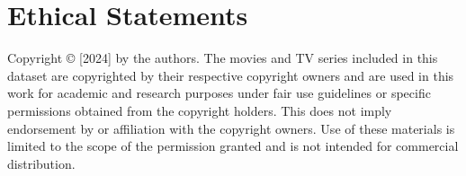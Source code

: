 \section*{Ethical Statements}

Copyright © [2024] by the authors. The movies and TV series included in this dataset are copyrighted by their respective copyright owners and are used in this work for academic and research purposes under fair use guidelines or specific permissions obtained from the copyright holders. This does not imply endorsement by or affiliation with the copyright owners. Use of these materials is limited to the scope of the permission granted and is not intended for commercial distribution.

